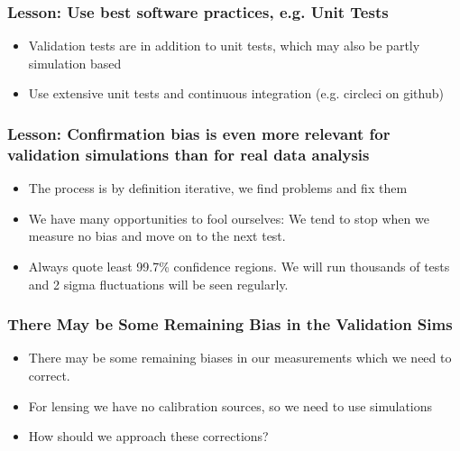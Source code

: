 \documentclass{beamer}
\begin{document}
\frame
{
    \frametitle{Lesson: Use best software practices, e.g. Unit Tests}

    \begin{itemize}

        \item Validation tests are in addition to unit tests, which may also be
            partly simulation based

        \item Use extensive unit tests and continuous integration (e.g. circleci
            on github)

    \end{itemize}

}

\frame
{

    \frametitle{Lesson: Confirmation bias is even more relevant for validation
    simulations than for real data analysis }

    \begin{itemize}

        \item The process is by definition iterative, we find problems and fix
            them

        \item We have many opportunities to fool ourselves:  We tend to stop when we
            measure no bias and move on to the next test.

        \item Always quote least 99.7\% confidence regions.  We will run
            thousands of tests and 2 sigma fluctuations will be seen regularly.

    \end{itemize}

}

\frame
{

    \frametitle{There May be Some Remaining Bias in the Validation Sims}

    \begin{itemize}

        \item There may be some remaining biases in our measurements which we
            need to correct.

        \item For lensing we have no calibration sources, so we need to use
            simulations

        \item How should we approach these corrections?

    \end{itemize}

}
\end{document}
